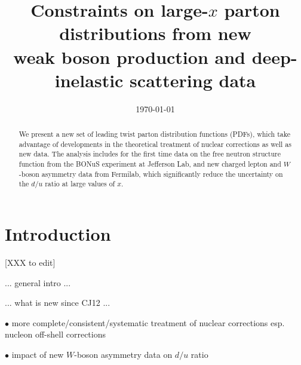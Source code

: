 \documentclass[aps,prd,amsmath,preprint]{revtex4}
\begin{document}
\title{Constraints on large-$x$ parton distributions from new \\
	weak boson production and deep-inelastic scattering data}

%


\date{\today}

\begin{abstract}
We present a new set of leading twist parton distribution functions
(PDFs), which take advantage of developments in the theoretical
treatment of nuclear corrections as well as new data.
The analysis includes for the first time data on the free neutron
structure function from the BONuS experiment at Jefferson Lab,
and new charged lepton and $W$-boson asymmetry data from Fermilab,
which significantly reduce the uncertainty on the $d/u$ ratio at
large values of $x$.
\end{abstract}

\maketitle


\section{Introduction} {\color{red} [XXX to edit]}
\label{sec:intro}

... general intro ...

... what is new since CJ12 ...

$\bullet$
more complete/consistent/systematic treatment of nuclear corrections
esp. nucleon off-shell corrections

$\bullet$
impact of new $W$-boson asymmetry data on $d/u$ ratio
\end{document}
